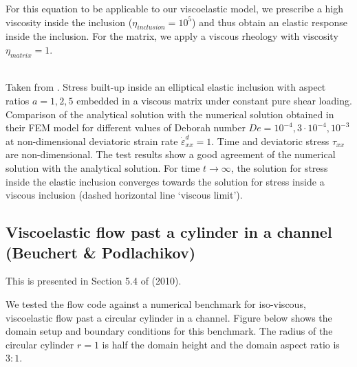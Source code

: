 For this equation to be applicable to our viscoelastic model, we prescribe a
high viscosity inside the inclusion ($\eta_{inclusion}=10^5$) and thus obtain an 
elastic response inside the inclusion. For the matrix, we apply a viscous
rheology with viscosity $\eta_{matrix} =1$.

\begin{center}
\\
{\captionfont Taken from \textcite{bepo10}.
Stress built-up inside an elliptical elastic inclusion with aspect ratios 
$a =1,2,5$ embedded in a viscous matrix under constant pure shear
loading. Comparison of the analytical solution 
with the numerical solution obtained in their FEM model for different values 
of Deborah number $De = 10^{-4},3\cdot10^{-4},10^{-3}$ 
at non-dimensional deviatoric strain rate $\dot\varepsilon_{xx}^d=1$. 
Time and deviatoric stress $\tau_{xx}$are non-dimensional.
The test results show a good agreement of the numerical solution with the 
analytical solution. For time $t\rightarrow \infty$, the solution for
stress inside the elastic inclusion converges towards the solution for stress 
inside a viscous inclusion (dashed horizontal line ‘viscous limit’).
}
\end{center}


\subsection{Viscoelastic flow past a cylinder in a channel (Beuchert \& Podlachikov)}

This is presented in Section 5.4 of \textcite{bepo10} (2010).

We tested the flow code against a numerical benchmark for iso-viscous, 
viscoelastic flow past a circular cylinder in a channel. Figure below shows
the domain setup and boundary conditions for this benchmark. The radius of the circular 
cylinder $r=1$ is half the domain height and the
domain aspect ratio is $3:1$. 


